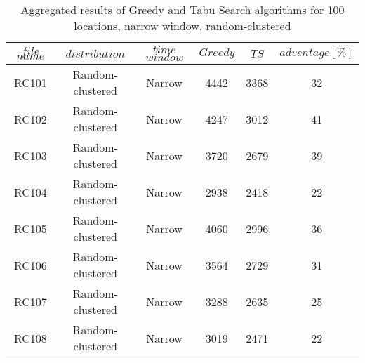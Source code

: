 \begin{table}[t]
\centering
\caption{
Aggregated results of Greedy and Tabu Search algorithms for 100 locations, narrow window, random-clustered}
\begin{tabular*}{0.8\linewidth}{@{\extracolsep{\fill}}cccccc}
\toprule
$file$ $name$ & $distribution$ & $time$ $window$ & $Greedy$ & $TS$ & $adventage[\%]$ \\ \midrule
RC101 & Random-clustered & Narrow & 4442 & 3368 & 32\\
RC102 & Random-clustered & Narrow & 4247 & 3012 & 41\\
RC103 & Random-clustered & Narrow & 3720 & 2679 & 39\\
RC104 & Random-clustered & Narrow & 2938 & 2418 & 22\\
RC105 & Random-clustered & Narrow & 4060 & 2996 & 36\\
RC106 & Random-clustered & Narrow & 3564 & 2729 & 31\\
RC107 & Random-clustered & Narrow & 3288 & 2635 & 25\\
RC108 & Random-clustered & Narrow & 3019 & 2471 & 22\\
\end{tabular*}\end{table}